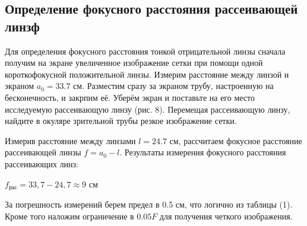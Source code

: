 \documentclass[15pt,a5paper,reqno]{article}
\begin{document}
\subsection{Определение фокусного расстояния рассеивающей линзф}

Для определения фокусного расстояния тонкой отрицательной линзы сначала получим на экране увеличенное изображение сетки при помощи одной короткофокусной положительной линзы. Измерим расстояние между линзой и экраном $a_0 = 33.7$ см.
Разместим сразу за экраном трубу, настроенную на бесконечность, и закрпим её. Уберём экран и поставьте на его место исследуемую рассеивающую линзу (рис. 8). Перемещая рассеивающую линзу, найдите в окуляре зрительной трубы резкое изображение сетки. \par
Измерив расстояние между линзами $l = 24.7$ см, рассчитаем фокусное расстояние рассеивающей линзы $f = a_0 - l$.
Результаты измерения фокусного расстояния рассеивающих линз:

\begin{center}
    $f_{рас} = 33,7 - 24,7 \approx 9$ см
\end{center}


За погрешность измерений берем предел в 0.5 см, что логично из таблицы (1). Кроме того наложим ограничение в $0.05F$ для получения четкого изображения.
\end{document}
